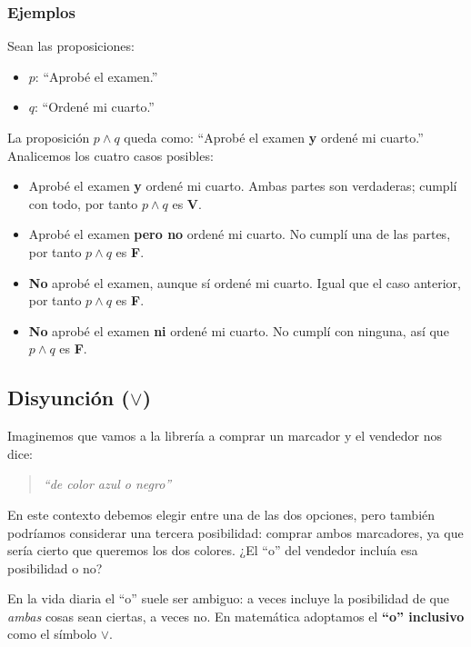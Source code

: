 \subsubsection*{Ejemplos}

Sean las proposiciones:
\begin{itemize}
    \item $p$: ``Aprobé el examen.''
    \item $q$: ``Ordené mi cuarto.''
\end{itemize}

\noindent La proposición $p \land q$ queda como: ``Aprobé el examen \textbf{y} ordené mi cuarto.'' Analicemos los cuatro casos posibles:

\begin{itemize}
    \item Aprobé el examen \textbf{y} ordené mi cuarto. Ambas partes son verdaderas; cumplí con todo, por tanto $p \land q$ es \textbf{V}.
    \item Aprobé el examen \textbf{pero no} ordené mi cuarto. No cumplí una de las partes, por tanto $p \land q$ es \textbf{F}.
    \item \textbf{No} aprobé el examen, aunque sí ordené mi cuarto. Igual que el caso anterior, por tanto $p \land q$ es \textbf{F}.
    \item \textbf{No} aprobé el examen \textbf{ni} ordené mi cuarto. No cumplí con ninguna, así que $p \land q$ es \textbf{F}.
\end{itemize}

\subsection{\texorpdfstring{Disyunción ($\lor$)}{Disyuncion}}

Imaginemos que vamos a la librería a comprar un marcador y el vendedor nos dice:

\begin{quote}
    \textit{``de color azul o negro''}
\end{quote}

\noindent En este contexto debemos elegir entre una de las dos opciones, pero también podríamos considerar una tercera posibilidad: comprar ambos marcadores, ya que sería cierto que queremos los dos colores. ¿El ``o'' del vendedor incluía esa posibilidad o no?

En la vida diaria el ``o'' suele ser ambiguo: a veces incluye la posibilidad de que \emph{ambas} cosas sean ciertas, a veces no. En matemática adoptamos el \textbf{``o'' inclusivo} como el símbolo $\lor$.

